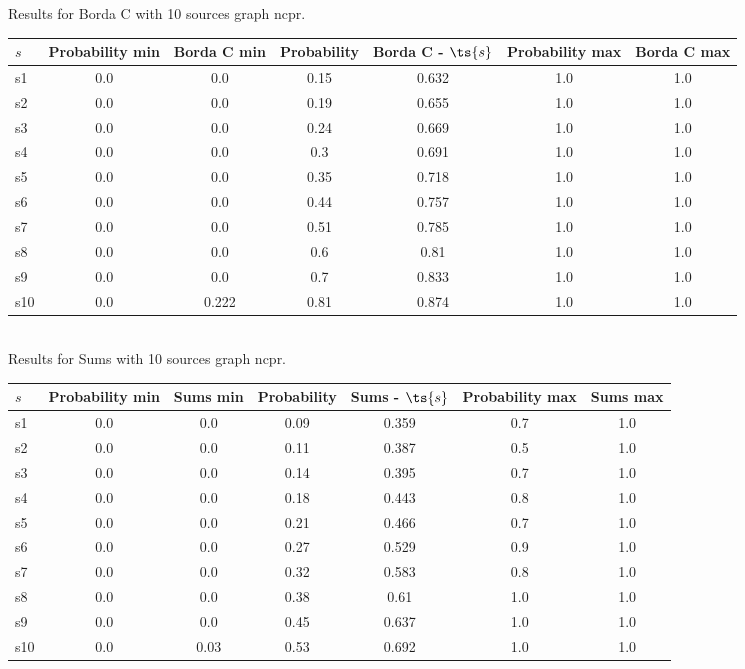 \documentclass{article}
\begin{document}
\noindent Results for Borda C with 10 sources graph ncpr.

\noindent\begin{tabular}{|l|c|c|c|c|c|c|}
\hline
$s$& Probability min & Borda C min & Probability & Borda C - $\ts{s}$ & Probability max & Borda C max\\
\hline
s1 &0.0 & 0.0 & 0.15 & 0.632 & 1.0 & 1.0\\
\hline
s2 &0.0 & 0.0 & 0.19 & 0.655 & 1.0 & 1.0\\
\hline
s3 &0.0 & 0.0 & 0.24 & 0.669 & 1.0 & 1.0\\
\hline
s4 &0.0 & 0.0 & 0.3 & 0.691 & 1.0 & 1.0\\
\hline
s5 &0.0 & 0.0 & 0.35 & 0.718 & 1.0 & 1.0\\
\hline
s6 &0.0 & 0.0 & 0.44 & 0.757 & 1.0 & 1.0\\
\hline
s7 &0.0 & 0.0 & 0.51 & 0.785 & 1.0 & 1.0\\
\hline
s8 &0.0 & 0.0 & 0.6 & 0.81 & 1.0 & 1.0\\
\hline
s9 &0.0 & 0.0 & 0.7 & 0.833 & 1.0 & 1.0\\
\hline
s10 &0.0 & 0.222 & 0.81 & 0.874 & 1.0 & 1.0\\
\hline
\end{tabular}\\

\noindent Results for Sums with 10 sources graph ncpr.

\noindent\begin{tabular}{|l|c|c|c|c|c|c|}
\hline
$s$& Probability min & Sums min & Probability & Sums - $\ts{s}$ & Probability max & Sums max\\
\hline
s1 &0.0 & 0.0 & 0.09 & 0.359 & 0.7 & 1.0\\
\hline
s2 &0.0 & 0.0 & 0.11 & 0.387 & 0.5 & 1.0\\
\hline
s3 &0.0 & 0.0 & 0.14 & 0.395 & 0.7 & 1.0\\
\hline
s4 &0.0 & 0.0 & 0.18 & 0.443 & 0.8 & 1.0\\
\hline
s5 &0.0 & 0.0 & 0.21 & 0.466 & 0.7 & 1.0\\
\hline
s6 &0.0 & 0.0 & 0.27 & 0.529 & 0.9 & 1.0\\
\hline
s7 &0.0 & 0.0 & 0.32 & 0.583 & 0.8 & 1.0\\
\hline
s8 &0.0 & 0.0 & 0.38 & 0.61 & 1.0 & 1.0\\
\hline
s9 &0.0 & 0.0 & 0.45 & 0.637 & 1.0 & 1.0\\
\hline
s10 &0.0 & 0.03 & 0.53 & 0.692 & 1.0 & 1.0\\
\hline
\end{tabular}\\
\end{document}
